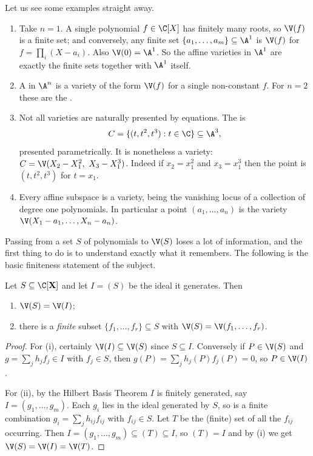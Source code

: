 Let us see some examples straight away.

\begin{example}
	\begin{enumerate}[label=(\roman*)]
		\item Take $n = 1$. A single polynomial $f \in \C[X]$ has finitely many roots, so $\V(f)$ is a finite set; and conversely, any finite set $\{a_1,\dots,a_m\} \subseteq \A^1$ is $\V(f)$ for $f = \prod_i (X - a_i)$. Also $\V(0) = \A^1$. So the affine varieties in $\A^1$ are exactly the finite sets together with $\A^1$ itself.
		\item A  in $\A^n$ is a variety of the form $\V(f)$ for a single non-constant $f$. For $n = 2$ these are the .
		\item Not all varieties are naturally presented by equations. The  is
		$$C = \{(t,t^2,t^3) : t \in \C\} \subseteq \A^3,$$
		presented parametrically. It is nonetheless a variety: $C = \V(X_2 - X_1^2,\ X_3 - X_1^3)$. Indeed if $x_2 = x_1^2$ and $x_3 = x_1^3$ then the point is $(t,t^2,t^3)$ for $t = x_1$.
		\item Every affine subspace is a variety, being the vanishing locus of a collection of degree one polynomials. In particular a point $(a_1,\dots,a_n)$ is the variety $\V(X_1-a_1,\dots,X_n-a_n)$.
	\end{enumerate}
\end{example}

Passing from a set $S$ of polynomials to $\V(S)$ loses a lot of information, and the first thing to do is to understand exactly what it remembers. The following is the basic finiteness statement of the subject.

\begin{theorem}\label{thm:Vfinite}
	Let $S \subseteq \C[\mathbf{X}]$ and let $I = (S)$ be the ideal it generates. Then
	\begin{enumerate}[label=(\roman*)]
		\item $\V(S) = \V(I)$;
		\item there is a \emph{finite} subset $\{f_1,\dots,f_r\} \subseteq S$ with $\V(S) = \V(f_1,\dots,f_r)$.
	\end{enumerate}
\end{theorem}

\begin{proof}
	For (i), certainly $\V(I) \subseteq \V(S)$ since $S \subseteq I$. Conversely if $P \in \V(S)$ and $g = \sum_j h_j f_j \in I$ with $f_j \in S$, then $g(P) = \sum_j h_j(P) f_j(P) = 0$, so $P \in \V(I)$.

	For (ii), by the Hilbert Basis Theorem $I$ is finitely generated, say $I = (g_1,\dots,g_m)$. Each $g_i$ lies in the ideal generated by $S$, so is a finite combination $g_i = \sum_j h_{ij} f_{ij}$ with $f_{ij} \in S$. Let $T$ be the (finite) set of all the $f_{ij}$ occurring. Then $I = (g_1,\dots,g_m) \subseteq (T) \subseteq I$, so $(T) = I$ and by (i) we get $\V(S) = \V(I) = \V(T)$.
\end{proof}

